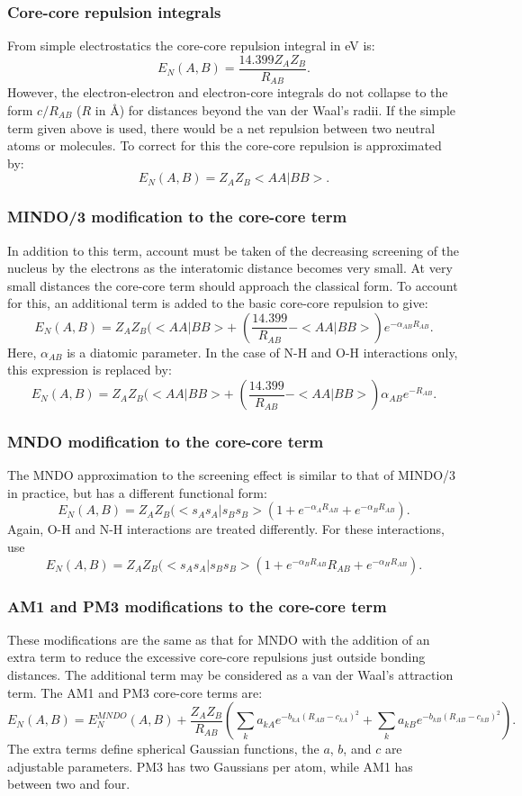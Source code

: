\documentclass[a4paper]{book}
\begin{document}
\subsubsection{Core-core repulsion integrals}
 From simple electrostatics the core-core repulsion
integral in eV is:
$$
E_N(A,B)=\frac{14.399Z_AZ_B}{R_{AB}}.
$$
However, the electron-electron and electron-core integrals
do not collapse to the form $c/R_{AB}$ ($R$ in \AA ) for distances
beyond the van der Waal's radii. If the simple term given
above is used, there would be a net repulsion between two
neutral atoms or molecules. To correct for this the
core-core repulsion is approximated by:
$$
E_N(A,B)=Z_AZ_B<AA|BB>.
$$
\subsubsection{MINDO/3 modification to the core-core term}
 In addition to this term, account must be taken of the
decreasing screening of the nucleus by the electrons as the
interatomic distance becomes very small. At very small
distances the core-core term should approach the classical
form. To account for this, an additional term is added to
the basic core-core repulsion to give:
$$
E_N(A,B)=Z_AZ_B(<AA|BB>+\;(\frac{14.399}{R_{AB}}-<AA|BB>)e^{-\alpha_{AB}R_{AB}}.
$$
 Here, $\alpha_{AB}$ is a diatomic parameter. In the case of N-H
and O-H interactions only, this expression is replaced by:
$$
E_N(A,B)=Z_AZ_B(<AA|BB>+\;(\frac{14.399}{R_{AB}}-<AA|BB>)\alpha_{AB}e^{-R_{AB} }.
$$
\subsubsection{MNDO modification to the core-core term}
 The MNDO approximation to the screening effect is
similar to that of MINDO/3 in practice, but has a different
functional form:
$$
E_N(A,B)=Z_AZ_B(<s_As_A|s_Bs_B>(1+e^{-\alpha_AR_{AB}} +e^{-\alpha_BR_{AB}}).
$$
 Again, O-H and N-H interactions are treated differently.
For these interactions, use
$$
E_N(A,B)=Z_AZ_B(<s_As_A|s_Bs_B>(1+e^{-\alpha_BR_{AB}}R_{AB}  +e^{-\alpha_HR_{AB}}).
$$
\subsubsection{AM1 and PM3 modifications to the core-core term}
 These modifications are the same as that for MNDO with
the addition of an extra term to reduce the excessive
core-core repulsions just outside bonding distances. The
additional term may be considered as a van der Waal's
attraction term. The AM1 and PM3 core-core terms are:
$$
E_N(A,B)=E_N^{MNDO}(A,B)+\frac{Z_AZ_B}{R_{AB}}
(\sum_ka_{kA}e^{-b_{kA}(R_{AB}-c_{kA})^2}+\sum_ka_{kB}e^{-b_{kB}(R_{AB}-c_{kB})^2}).
$$
The extra terms define spherical Gaussian functions, the $a$,
$b$, and $c$ are adjustable parameters. PM3 has two Gaussians
per atom, while AM1 has between two and four.
\end{document}
